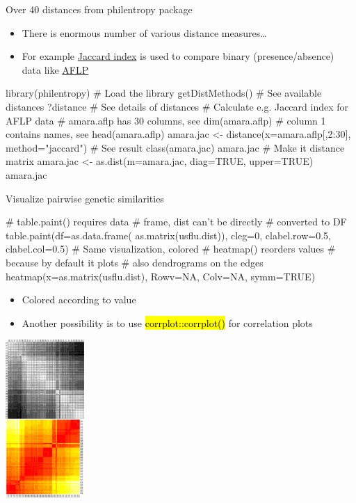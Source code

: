 \documentclass[compress, ucs, xelatex, 11pt, xcolor=svgnames,
  hyperref={
    bookmarks=true,
    unicode=true,
    colorlinks=true,
    pdftitle={Molecular data in R},
    plainpages=false,
    pdfauthor={Vojtech Zeisek},
    pdfsubject={Course about phylogeny and evolution in R},
    pdfcreator={XeLaTeX},
    pdfkeywords={R, evolution, phylogeny, molecular data},
    linkcolor=Tomato,
    anchorcolor=SaddleBrown,
    citecolor=Goldenrod,
    filecolor=DarkMagenta,
    menucolor=Sienna,
    urlcolor=DarkTurquoise,
    pdftex},
  url={hyphens, lowtilde} %
  ]{beamer}
\renewcommand{\texttt}[1]{\hl{\ttfamily #1}}
\begin{document}
\begin{frame}[fragile]{Over 40 distances from philentropy package}
  \begin{itemize}
    \item There is enormous number of various distance measures\ldots
    \item For example \href{https://en.wikipedia.org/wiki/Jaccard_index}{Jaccard index} is used to compare binary (presence/absence) data like \href{https://en.wikipedia.org/wiki/Amplified_fragment_length_polymorphism}{AFLP}
  \end{itemize}
  \begin{spluscode}
    library(philentropy) # Load the library
    getDistMethods() # See available distances
    ?distance # See details of distances
    # Calculate e.g. Jaccard index for AFLP data
    # amara.aflp has 30 columns, see dim(amara.aflp)
    # column 1 contains names, see head(amara.aflp)
    amara.jac <- distance(x=amara.aflp[,2:30], method="jaccard")
    # See result
    class(amara.jac)
    amara.jac
    # Make it distance matrix
    amara.jac <- as.dist(m=amara.jac, diag=TRUE, upper=TRUE)
    amara.jac
  \end{spluscode}
\end{frame}

\begin{frame}[fragile]{Visualize pairwise genetic similarities}
\begin{multicols}{2}
\vfil
  \begin{spluscode}
    # table.paint() requires data
    # frame, dist can't be directly
    # converted to DF
    table.paint(df=as.data.frame(
      as.matrix(usflu.dist)), cleg=0,
      clabel.row=0.5, clabel.col=0.5)
    # Same visualization, colored
    # heatmap() reorders values
    # because by default it plots
    # also dendrograms on the edges
    heatmap(x=as.matrix(usflu.dist),
      Rowv=NA, Colv=NA, symm=TRUE)
  \end{spluscode}
\begin{itemize}
 \item Colored according to value
 \item Another possibility is to use \texttt{corrplot::corrplot()} for correlation plots
\end{itemize}
  \columnbreak
  \begin{center}
    \includegraphics[height=6cm]{dna-dists.png}
  \end{center}
\end{multicols}
\end{frame}
\end{document}
